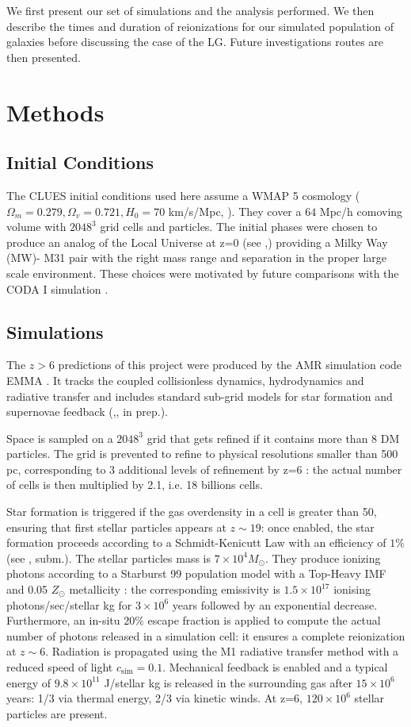 \documentclass[twocolumn]{aastex61}
\newcommand{\dom}[1]{{#1}}
\begin{document}
We first present our set of simulations and the analysis performed. We then describe the times and duration of reionizations for our simulated population of galaxies before discussing the case of the LG. Future investigations routes are then presented.

\section{Methods}

\subsection{Initial Conditions}
The CLUES initial conditions used here assume a WMAP 5 cosmology ($\Omega_m=0.279, \Omega_v=0.721, H_0=70$ km/s/Mpc, \citet{HIN9}). They cover a $64$ Mpc/h comoving volume with $2048^3$ grid cells and particles.  The initial phases were chosen to produce an analog of the Local Universe at z=0 (see \citet{GOT10},\citet{ILI11}) providing a Milky Way (MW)- M31 pair with the right mass range and separation in the proper large scale environment. These choices were motivated by future comparisons with the CODA I simulation \citep{OCV16}.

\subsection{Simulations}
The $z>6$ predictions of this project were produced by the AMR simulation code EMMA \citep{AUB15}. It tracks the coupled collisionless dynamics, hydrodynamics and radiative transfer and includes standard sub-grid models for star formation and supernovae feedback (\citet{RAS06},\citet{DEP17}, in prep.). 

Space is sampled on a $2048^3$  grid that gets refined if it contains more than 8 DM particles. The grid is prevented to refine to physical resolutions smaller than 500 pc, corresponding to 3 additional levels of refinement by z=6 : the actual number of cells is then multiplied by 2.1, i.e. 18 billions cells. 

Star formation is triggered if the gas overdensity in a cell is greater than 50, ensuring that first stellar particles appears at $z\sim 19$: once enabled, the star formation proceeds according to a Schmidt-Kenicutt Law with an efficiency of $1\%$ (see \citet{RAS06},\citet{DEP17} subm.). The stellar particles mass is  $7\times 10^4 M_\odot$. They produce ionizing photons according to a Starburst 99 population model \citep{LEI99} with a Top-Heavy IMF and 0.05 $Z_\odot$ metallicity : the corresponding emissivity is $1.5\times 10^{17}$ ionising photons/sec/stellar kg for $3\times 10^6$ years followed by an exponential decrease. Furthermore, an in-situ $20\%$ escape fraction is applied to compute the actual number of photons released in a simulation cell: it ensures a complete reionization at $z\sim 6$.  \dom{Radiation is propagated using the M1 radiative transfer method with a reduced speed of light $c_\mathrm{sim}=0.1$}. Mechanical feedback is enabled and a typical energy of $9.8\times 10^{11}$ J/stellar kg is released in the surrounding gas after $15\times 10^6$ years: 1/3 via thermal energy, 2/3 via kinetic winds. At z=6, $120\times 10^6$ stellar particles are present.
\end{document}
